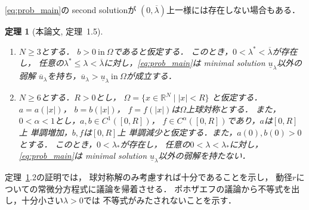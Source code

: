 \documentclass{jsarticle}
\newcommand{\sage}{
\addtolength{\itemindent}{1zw}
\addtolength{\parindent}{1zw}}
\theoremstyle{plain}
\newtheorem{thm}{定理}
\renewcommand{\bar}[1]{\overline{#1}}
\newcommand{\R}{\mathbb{R}}
\newcommand{\tin}{\text{in}~}
\begin{document}
\ref{eq:prob_main}の second solutionが
$(0, \bar{\lambda})$上一様には存在しない場合もある．

\begin{thm}[本論文, 定理~1.5] \label{thm:second_solution_nonex}
 \begin{enumerate}[1.]  \sage
  \item $N \geq 3$とする．
        $b > 0 ~\tin \Omega$であると仮定する．
        このとき，$0 < \lambda^* < \bar{\lambda}$が存在し，
        任意の$\lambda^* \leq
        \lambda < \bar{\lambda}$に対し，\ref{eq:prob_main}は
        minimal solution $\underline{u}_\lambda$以外の弱解
        $\bar{u}_\lambda$を持ち，$\bar{u}_\lambda >
        \underline{u}_\lambda ~\tin \Omega$が成立する．
  \item $N \geq 6$とする．$R > 0$とし，
        $\Omega = \{ x \in \R^N \mid \lvert x \rvert < R\}$
        と仮定する．
        $a = a(\lvert x \rvert)$，
        $b = b(\lvert x \rvert)$，
        $f = f(\lvert x \rvert)$は$\Omega$上球対称とする．
        また，$0 < \alpha < 1$とし，$a , b \in C^1([0, R])$，
        $f \in C^\alpha([0, R])$であり，$a$は$[0, R]$上
        単調増加，$b, f$は$[0, R]$上
        単調減少と仮定する．また，$a(0), b(0) > 0$とする．
        このとき，$0 < \lambda_*$が存在し，
        任意の$0 < \lambda < \lambda_*$に対し，
        \ref{eq:prob_main}は
        minimal solution $\underline{u}_\lambda$以外の弱解を持たない．
 \end{enumerate}
\end{thm}

定理~\ref{thm:second_solution_nonex}.2の証明では，
球対称解のみ考慮すれば十分であることを示し，
動径$r$についての常微分方程式に議論を帰着させる．
ポホザエフの議論から不等式を出し，十分小さい$\lambda > 0$では
不等式がみたされないことを示す．



\end{document}
